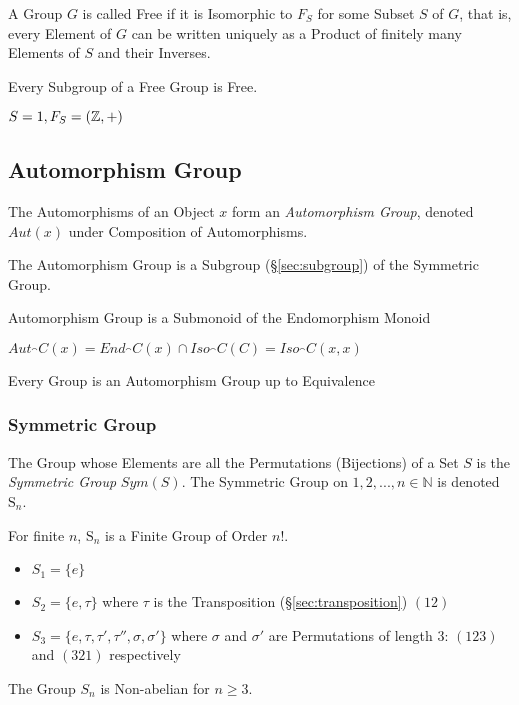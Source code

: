 A Group $G$ is called Free if it is Isomorphic to $F_S$ for some
Subset $S$ of $G$, that is, every Element of $G$ can be written
uniquely as a Product of finitely many Elements of $S$ and their
Inverses.

Every Subgroup of a Free Group is Free. \cite{hatcher02}

$S = {1}, F_S = (\mathbb{Z},+)$



\subsection{Automorphism Group}\label{sec:automorphism_group}

The Automorphisms of an Object $x$ form an \emph{Automorphism Group},
denoted $Aut(x)$ under Composition of Automorphisms.

The Automorphism Group is a Subgroup (\S\ref{sec:subgroup}) of the
Symmetric Group.

Automorphism Group is a Submonoid of the Endomorphism Monoid %

$Aut_\cat{C}(x) = End_\cat{C}(x) \cap Iso_\cat{C}(C) =
Iso_\cat{C}(x,x)$

Every Group is an Automorphism Group up to Equivalence %



\subsubsection{Symmetric Group}\label{sec:symmetric_group}

The Group whose Elements are all the Permutations (Bijections) of a
Set $S$ is the \emph{Symmetric Group} $Sym(S)$. The Symmetric Group on
${1, 2, ..., n} \in \mathbb{N}$ is denoted $\mathrm{S}_n$.

For finite $n$, $\mathrm{S}_n$ is a Finite Group of Order $n!$.

\begin{itemize}
    \item $S_1 = \{e\}$
    \item $S_2 = \{e,\tau\}$ where $\tau$ is the Transposition
      (\S\ref{sec:transposition}) $(12)$
    \item $S_3 = \{e, \tau, \tau', \tau'', \sigma, \sigma'\}$ where
      $\sigma$ and $\sigma'$ are Permutations of length 3: $(123)$ and
      $(321)$ respectively
\end{itemize}
The Group $S_n$ is Non-abelian for $n \geq 3$.


